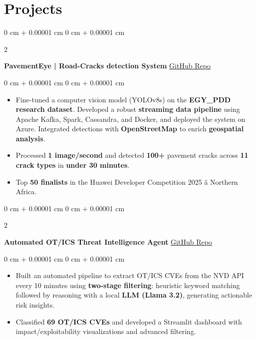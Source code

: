 \documentclass[9pt, letterpaper]{extarticle}
\newenvironment{highlights}{
    \begin{itemize}[
        topsep=0.06 cm,
        parsep=0.06 cm,
        partopsep=0pt,
        itemsep=0pt,
        leftmargin=0 cm + 10pt
    ]
}{
    \end{itemize}
} %
\newenvironment{onecolentry}{
    \begin{adjustwidth}{
        0 cm + 0.00001 cm
    }{
        0 cm + 0.00001 cm
    }
}{
    \end{adjustwidth}
} %
\newenvironment{twocolentry}[2][]{
    \onecolentry
    \def\secondColumn{#2}
    \setcolumnwidth{\fill, 4.5 cm}
    \begin{paracol}{2}
}{
    \switchcolumn \raggedleft \secondColumn
    \end{paracol}
    \endonecolentry
} %
\begin{document}
    \section{Projects}

        \begin{twocolentry}{
            \href{https://github.com/yahia997/PavementEye}{\underline{GitHub Repo}}
        }
            \textbf{PavementEye | Road-Cracks detection System}\end{twocolentry}

        \begin{onecolentry}
            \begin{highlights}
                \item Fine-tuned a computer vision model (YOLOv8s) on the \textbf{EGY\_PDD research dataset}. Developed a robust \textbf{streaming data pipeline} using Apache Kafka, Spark, Cassandra, and Docker, and deployed the system on Azure. Integrated detections with \textbf{OpenStreetMap} to enrich \textbf{geospatial analysis}.
                \item Processed \textbf{1 image/second} and detected \textbf{100+} pavement cracks across \textbf{11 crack types} in \textbf{under 30 minutes}.
                \item Top \textbf{50 finalists} in the Huawei Developer Competition 2025 â Northern Africa.
            \end{highlights}
        \end{onecolentry}
        
        \begin{twocolentry}{
            \href{https://github.com/yahia997/Automated-Threat-Intelligence-Agent}{\underline{GitHub Repo}}
        }
            \textbf{Automated OT/ICS Threat Intelligence Agent}\end{twocolentry}

        
        \begin{onecolentry}
            \begin{highlights}
                \item Built an automated pipeline to extract OT/ICS CVEs from the NVD API every 10 minutes using \textbf{two-stage filtering}: heuristic keyword matching followed by reasoning with a local \textbf{LLM (Llama 3.2)}, generating actionable risk insights.
                
                \item Classified \textbf{69 OT/ICS CVEs} and developed a Streamlit dashboard with impact/exploitability visualizations and advanced filtering.
            \end{highlights}
        \end{onecolentry}
        
\end{document}
